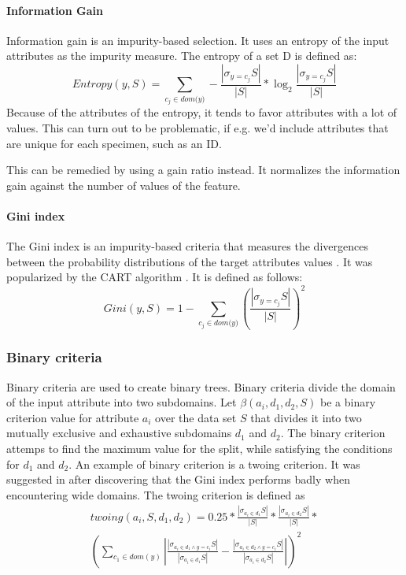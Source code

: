 \documentclass[thesis=B,english]{FITthesis}[2012/10/20]
\begin{document}
				\paragraph*{Information Gain}
				Information gain is an  impurity-based selection. It uses an entropy of the input attributes as the impurity measure. The entropy of a set D is defined as:
				\[
				\textit{Entropy}\left(y, S\right) = \sum _{c_j \in \textit{dom(y)}}-\frac{|\sigma_{y=c_j}S|}{|S|}*\log_2\frac{|\sigma_{y=c_j}S|}{|S|}
				\] 
				Because of the attributes of the entropy, it tends to favor attributes with a lot of values. This can turn out to be problematic, if e.g. we'd include attributes that are unique for each specimen, such as an ID. \cite{ENSEMBLE}
				
				This can be remedied by using a gain ratio instead. It normalizes the information gain against the number of values of the feature.
				\paragraph*{Gini index}
				The Gini index is an impurity-based criteria that measures the divergences between the probability distributions of the target attributes values \cite{DMWithDecisionTrees}. It was popularized by the CART algorithm \cite{CART}. It is defined as follows:
				\[
					\textit{Gini}\left(y, S\right)=1 - \sum _{c_j \in \textit{dom(y)}}\left(\frac{|\sigma_{y=c_j}S|}{|S|}\right)^2
				\]
				\subsubsection{Binary criteria}
				Binary criteria are used to create binary trees. Binary criteria divide the domain of the input attribute into two subdomains. Let \(\beta(a_i, d_1, d_2, S)\) be a binary criterion value for attribute \(a_i\) over the data set \(S\) that divides it into two mutually exclusive and exhaustive subdomains \(d_1\) and \(d_2\). The binary criterion attemps to find the maximum value for the split, while satisfying the conditions for \(d_1\) and \(d_2\). An example of binary criterion is a twoing criterion. It was suggested in \cite{CART} after discovering that the Gini index performs badly when encountering wide domains. The twoing criterion is defined as
				\begin{multline}
					\textit{twoing}(a_i, S, d_1, d_2) = 0.25 * \frac{|\sigma_{a_{i} \in d_1}S|}{|S|}* \frac{|\sigma_{a_{i} \in d_2}S|}{|S|}  * \\ \left(\sum_{c_{1}\in\textit{dom}(y)}{
					\left|
					\frac{\left|
							\sigma_{a_{i}\in d_{1} \wedge y=c_i}S
						\right|}
						{|\sigma_{a_{i} \in d_1}S|} - \frac{\left|
							\sigma_{a_{i}\in d_{2} \wedge y=c_i}S
						\right|}
						{|\sigma_{a_{i} \in d_2}S|}
					\right|
					}\right)^2
				\end{multline}
\end{document}
